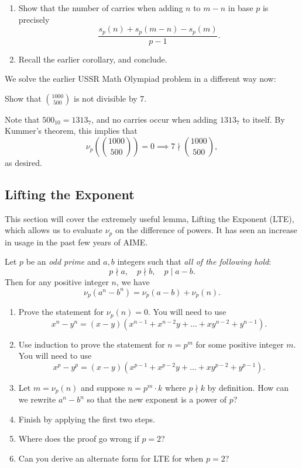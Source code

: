 \documentclass{article}
\begin{document}
\begin{walk}
    \begin{enumerate}
        \item Show that the number of carries when adding $n$ to $m-n$ in base $p$ is precisely \[\frac{s_p(n)+s_p(m-n)-s_p(m)}{p-1}.\]
        \item Recall the earlier corollary, and conclude.
    \end{enumerate}
\end{walk}

We solve the earlier USSR Math Olympiad problem in a different way now:
\begin{exam}
    Show that $\binom{1000}{500}$ is not divisible by 7.
\end{exam}

\begin{sol}
    Note that $500_{10}=1313_7$, and no carries occur when adding $1313_7$ to itself. By Kummer's theorem, this implies that \[\nu_p\left( \binom{1000}{500} \right)=0\implies 7\nmid \binom{1000}{500},\] as desired.
\end{sol}
\subsection{Lifting the Exponent}
This section will cover the extremely useful lemma, Lifting the Exponent (LTE), which allows us to evaluate $\nu_p$ on the difference of powers. It has seen an increase in usage in the past few years of AIME.\\

\begin{theo}[LTE]
    Let $p$ be an \emph{odd prime} and $a,b$ integers such that \emph{all of the following hold}: \[p\nmid a,\quad p\nmid b,\quad p\mid a-b.\] Then for any positive integer $n$, we have \[\nu_p(a^n-b^n)=\nu_p(a-b)+\nu_p(n).\]
\end{theo}

\begin{walk}
    \begin{enumerate}
        \item Prove the statement for $\nu_p(n)=0$. You will need to use \[x^n-y^n=(x-y)\left(x^{n-1}+x^{n-2}y+\dots+xy^{n-2}+y^{n-1}\right).\]
        \item Use induction to prove the statement for $n=p^m$ for some positive integer $m$. You will need to use \[x^p-y^p=(x-y)\left(x^{p-1}+x^{p-2}y+\dots+xy^{p-2}+y^{p-1}\right).\]
        \item Let $m=\nu_p(n)$ and suppose $n=p^m\cdot k$ where $p\nmid k$ by definition. How can we rewrite $a^n-b^n$ so that the new exponent is a power of $p$?
        \item Finish by applying the first two steps.
        \item Where does the proof go wrong if $p=2$?
        \item Can you derive an alternate form for LTE for when $p=2$?
    \end{enumerate}
\end{walk}
\end{document}
